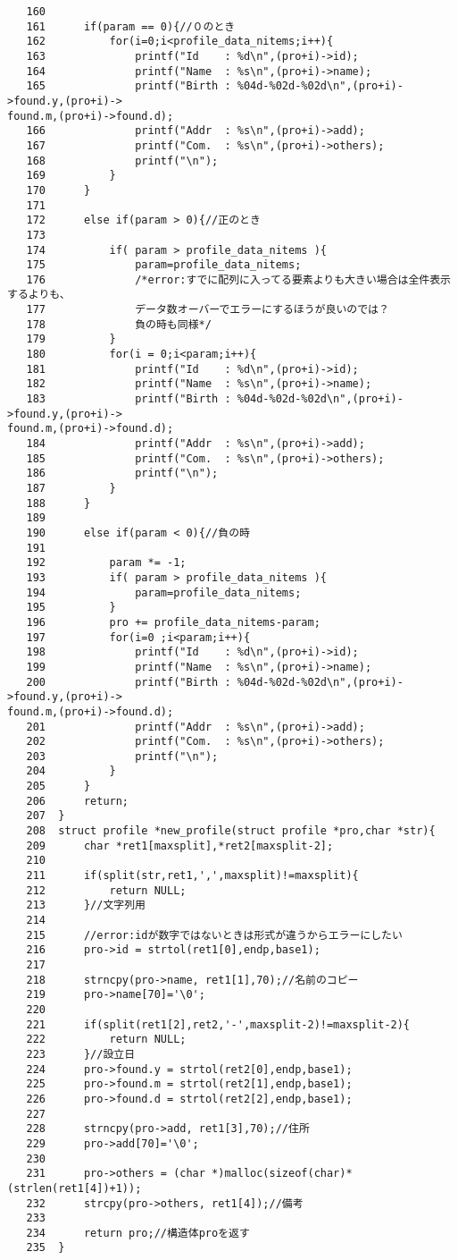 \documentclass[a4j,11pt]{jarticle}
\begin{document}
{\begin{verbatim}
   160
   161      if(param == 0){//０のとき
   162          for(i=0;i<profile_data_nitems;i++){
   163              printf("Id    : %d\n",(pro+i)->id);
   164              printf("Name  : %s\n",(pro+i)->name);
   165              printf("Birth : %04d-%02d-%02d\n",(pro+i)->found.y,(pro+i)->
found.m,(pro+i)->found.d);
   166              printf("Addr  : %s\n",(pro+i)->add);
   167              printf("Com.  : %s\n",(pro+i)->others);
   168              printf("\n");
   169          }
   170      }
   171
   172      else if(param > 0){//正のとき
   173
   174          if( param > profile_data_nitems ){
   175              param=profile_data_nitems;
   176              /*error:すでに配列に入ってる要素よりも大きい場合は全件表示するよりも、
   177              データ数オーバーでエラーにするほうが良いのでは？
   178              負の時も同様*/
   179          }
   180          for(i = 0;i<param;i++){
   181              printf("Id    : %d\n",(pro+i)->id);
   182              printf("Name  : %s\n",(pro+i)->name);
   183              printf("Birth : %04d-%02d-%02d\n",(pro+i)->found.y,(pro+i)->
found.m,(pro+i)->found.d);
   184              printf("Addr  : %s\n",(pro+i)->add);
   185              printf("Com.  : %s\n",(pro+i)->others);
   186              printf("\n");
   187          }
   188      }
   189
   190      else if(param < 0){//負の時
   191
   192          param *= -1;
   193          if( param > profile_data_nitems ){
   194              param=profile_data_nitems;
   195          }
   196          pro += profile_data_nitems-param;
   197          for(i=0 ;i<param;i++){
   198              printf("Id    : %d\n",(pro+i)->id);
   199              printf("Name  : %s\n",(pro+i)->name);
   200              printf("Birth : %04d-%02d-%02d\n",(pro+i)->found.y,(pro+i)->
found.m,(pro+i)->found.d);
   201              printf("Addr  : %s\n",(pro+i)->add);
   202              printf("Com.  : %s\n",(pro+i)->others);
   203              printf("\n");
   204          }
   205      }
   206      return;
   207  }
   208  struct profile *new_profile(struct profile *pro,char *str){
   209      char *ret1[maxsplit],*ret2[maxsplit-2];
   210
   211      if(split(str,ret1,',',maxsplit)!=maxsplit){
   212          return NULL;
   213      }//文字列用
   214
   215      //error:idが数字ではないときは形式が違うからエラーにしたい
   216      pro->id = strtol(ret1[0],endp,base1);
   217
   218      strncpy(pro->name, ret1[1],70);//名前のコピー
   219      pro->name[70]='\0';
   220
   221      if(split(ret1[2],ret2,'-',maxsplit-2)!=maxsplit-2){
   222          return NULL;
   223      }//設立日
   224      pro->found.y = strtol(ret2[0],endp,base1);
   225      pro->found.m = strtol(ret2[1],endp,base1);
   226      pro->found.d = strtol(ret2[2],endp,base1);
   227
   228      strncpy(pro->add, ret1[3],70);//住所
   229      pro->add[70]='\0';
   230
   231      pro->others = (char *)malloc(sizeof(char)*(strlen(ret1[4])+1));
   232      strcpy(pro->others, ret1[4]);//備考
   233
   234      return pro;//構造体proを返す
   235  }
\end{verbatim}
}
\end{document}
